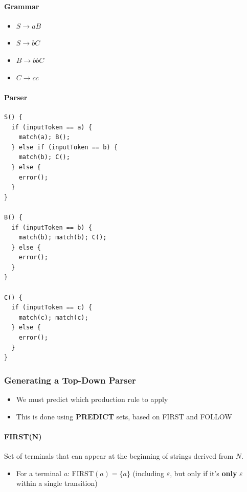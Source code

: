 \documentclass{article}
\begin{document}
\paragraph{Grammar}
\begin{itemize}
  \item $S \to aB$
  \item $S \to bC$
  \item $B \to bbC$
  \item $C \to cc$
\end{itemize}

\paragraph{Parser}
\begin{lstlisting}
S() {
  if (inputToken == a) {
    match(a); B();
  } else if (inputToken == b) {
    match(b); C();
  } else {
    error();
  }
}

B() {
  if (inputToken == b) {
    match(b); match(b); C();
  } else {
    error();
  }
}

C() {
  if (inputToken == c) {
    match(c); match(c);
  } else {
    error();
  }
}
\end{lstlisting}


\subsubsection{Generating a Top-Down Parser}

\begin{itemize}
  \item We must predict which production rule to apply
  \item This is done using \textbf{PREDICT} sets, based on FIRST and FOLLOW
\end{itemize}

\paragraph{FIRST(N)}
Set of terminals that can appear at the beginning of strings derived from $N$.

\begin{itemize}
  \item For a terminal $a$: FIRST$(a) = \{a\}$ (including $\varepsilon$, but only if it's \textbf{only} $\varepsilon$ within a single transition)
\end{itemize}
\end{document}

